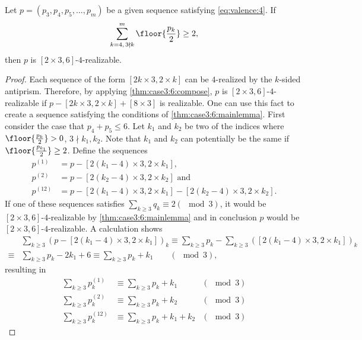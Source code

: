 \begin{theorem}\label{thm:case3:6:main}
  Let $p = (p_3, p_4, p_5, \dots, p_m)$ be a given sequence satisfying \autoref{eq:valence:4}. If
  \begin{align*}
    \sum_{k=4,\, 3 \nmid k}^m \floor{\frac{p_k}{2}} \geq 2,
  \end{align*}
  then $p$ is $[2 \times 3, 6]$-$4$-realizable.
  \begin{proof}
    Each sequence of the form $[2k \times 3, 2 \times k]$ can be $4$-realized by the $k$-sided antiprism. Therefore, by applying \autoref{thm:case3:6:compose}, $p$ is $[2 \times 3, 6]$-$4$-realizable if $p - [2k \times 3, 2 \times k] + [8 \times 3]$ is realizable. One can use this fact to create a sequence satisfying the conditions of \autoref{thm:case3:6:mainlemma}. First consider the case that $p_4 + p_5 \leq 6$. Let $k_1$ and $k_2$  be two of the indices where $\floor{\frac{p_k}{2}} > 0$, $3 \nmid k_1, k_2$. Note that $k_1$ and $k_2$ can potentially be the same if $\floor{\frac{p_{k_1}}{2}} \geq 2$. Define the sequences 
    \begin{align*}
      p^{(1)} &= p - [2(k_1 - 4) \times 3, 2 \times k_1], \\
      p^{(2)} &= p - [2(k_2 - 4) \times 3, 2 \times k_2] \text{ and } \\
      p^{(12)} &= p - [2(k_1 - 4) \times 3, 2 \times k_1] - [2(k_2 - 4) \times 3, 2 \times k_2].
    \end{align*}
    If one of these sequences satisfies $\sum_{k\geq 3} q_k \equiv 2 (\mod 3)$, it would be $[2 \times 3, 6]$-$4$-realizable by \autoref{thm:case3:6:mainlemma} and in conclusion $p$ would be $[2 \times 3, 6]$-$4$-realizable. A calculation shows
    \begin{align*}
      &\sum_{k\geq 3} (p - [2(k_1 - 4) \times 3, 2 \times k_1])_k  \equiv \sum_{k\geq 3} p_k - \sum_{k\geq 3} ([2(k_1 - 4) \times 3, 2 \times k_1])_k \\
      \equiv& \sum_{k\geq 3} p_k - 2k_1 + 6 \equiv \sum_{k\geq 3} p_k + k_1 \qquad (\mod 3),
    \end{align*}
    resulting in
    \begin{align*}
      \sum_{k\geq 3} p^{(1)}_k  &\equiv \sum_{k\geq 3} p_k + k_1  & (\mod 3) \\
      \sum_{k\geq 3} p^{(2)}_k  &\equiv \sum_{k\geq 3} p_k + k_2  & (\mod 3) \\
      \sum_{k\geq 3} p^{(12)}_k  &\equiv \sum_{k\geq 3} p_k + k_1 + k_2  & (\mod 3)
    \end{align*}

\end{proof}
\end{theorem}

